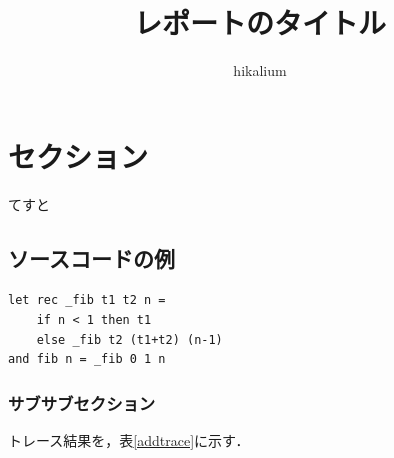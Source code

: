 
\title{レポートのタイトル}
\author{hikalium}
\maketitle
\thispagestyle{fancy}

\section{セクション}
てすと
\subsection{ソースコードの例}

\begin{lstlisting}[basicstyle=\ttfamily\footnotesize, frame=single]
let rec _fib t1 t2 n = 
    if n < 1 then t1
    else _fib t2 (t1+t2) (n-1)
and fib n = _fib 0 1 n
\end{lstlisting}

\subsubsection{サブサブセクション}
トレース結果を，表\ref{addtrace}に示す．

